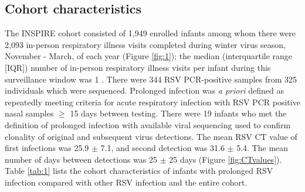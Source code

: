 \documentclass{article} %
\begin{document}
\subsection{Cohort characteristics}
The INSPIRE cohort consisted of 1,949 enrolled infants among whom there were 2,093 in-person respiratory illness visits completed during winter virus season, November - March, of each year
(Figure \ref{fig:1}); 
the median (interquartile range [IQR]) number of in-person respiratory illness visits per infant during this surveillance window was 1
\citep{lawless2020genome, hall_burden_2009}.
There were 344 RSV PCR-positive samples from 325 individuals which were sequenced. 
Prolonged infection was \textit{a priori} defined as repeatedly meeting criteria for acute respiratory infection with RSV PCR positive nasal samples $\ge$ 15 days between testing. 
There were 19 infants who met the definition of prolonged infection with available viral sequencing used to confirm clonality of original and subsequent virus detections. 
The mean RSV CT value of first infections was 25.9 $\pm$ 7.1, and second detection was 31.6 $\pm$ 5.4. 
The mean number of days between detections was 25 $\pm$ 25 days 
(Figure \ref{fig:CTvalues}).
Table \ref{tab:1} lists the cohort characteristics of infants with prolonged RSV infection compared with other RSV infection and the entire cohort.
					
\end{document}
